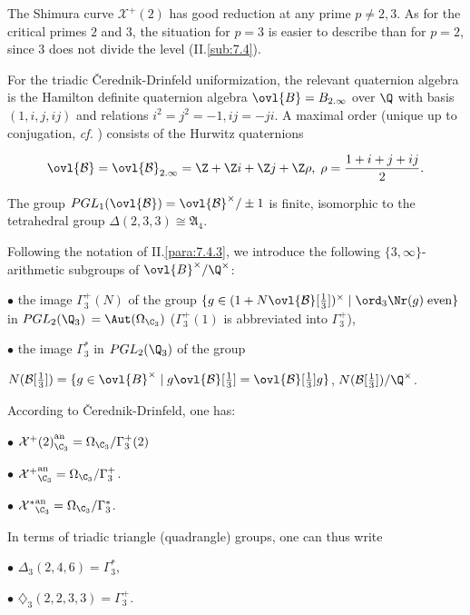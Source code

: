 \begin{para}\label{para::6.3.1} The Shimura curve $\mathcal{X}^+(2)$ has good
 reduction at any prime $p\neq 2,3$. As for the critical primes $2$ and
 $3$, the situation for $p=3$ is easier to describe than for $p=2$,
 since $3$ does not divide the level (II.\ref{sub:7.4}). 

 For the triadic \v{C}erednik-Drinfeld uniformization, the relevant
 quaternion algebra is the Hamilton definite quaternion algebra
 $\ovl{B}=B_{2.\infty}$ over $\Q$ with basis $(1,i,j,ij)$ and relations
 $i^2=j^2=-1, ij=-ji$. A maximal order (unique up to conjugation, {\it
 cf.} \cite[5.11]{adadq}) consists of the Hurwitz quaternions 

\begin{equation*}
\ovl{\mathcal{B}}=\ovl{\mathcal{B}}_{2.\infty} = \Z  + \Z i + \Z j + \Z
 \rho,\;\rho =\frac{1+i+j+ij}{2}. 
\end{equation*}
  
\noindent
The group $PGL_1(\ovl{\mathcal{B}})=\ovl{\mathcal{B}}^\times/\pm 1$ is
 finite, isomorphic to the tetrahedral group $\Delta(2,3,3)\cong
 \mathfrak{A}_4$.

\medskip 
Following the notation of  II.\ref{para:7.4.3}, we introduce the following
 $\{3,\infty\}$-arithmetic subgroups of $\ovl{B}^\times/\Q^\times$: 

\medskip $\bullet$ the image $\Gamma_3^+(N)$ of the group $\{g \in
 (1+N\ovl{\mathcal{B}}[\frac{1}{3}])^\times\mid \ord_3 \Nr(g) \;{\rm
 {even}}\}$ in $PGL_2(\Q_3)$ $=\Aut(\Omega_{\C_3})$  ($\Gamma_3^+(1)$
 is abbreviated into
 $\Gamma_3^+$),

 \medskip $\bullet$ the image $\Gamma_3^\ast$ in $PGL_2(\Q_3)$ of the group 
 
 \noindent $N(\mathcal{B} [\frac{1}{3}])=\{g\in \ovl{B}^\times \mid 
 g\ovl{\mathcal{B}}[\frac{1}{3}]=\ovl{\mathcal{B}}[\frac{1}{3}]g\}$,
 \ie $N(\mathcal{B}[\frac{1}{3}])/\Q^\times$.
 
\medskip According to \v{C}erednik-Drinfeld, one has:

\medskip
 $\bullet$
 ${\mathcal{X}^+(2)}_{\C_3}^{\mathrm{an}}=\Omega_{\C_3}/\Gamma_3^+(2)$ 
\medskip

$\bullet$ ${\mathcal{X}^+}_{\C_3}^{\mathrm{an}}=\Omega_{\C_3}/\Gamma_3^+$. 

\medskip

$\bullet$
 ${\mathcal{X}^\ast}_{\C_3}^{\mathrm{an}}=\Omega_{\C_3}/\Gamma_3^\ast$.

 In terms of triadic triangle (\resp quadrangle) groups, one can
 thus write 
 
\medskip
$\bullet$ $\Delta_3(2,4,6)=\Gamma_3^\ast$, 

$\bullet$ $\diamondsuit_3 (2,2,3,3)=\Gamma_3^+$.
\end{para}


